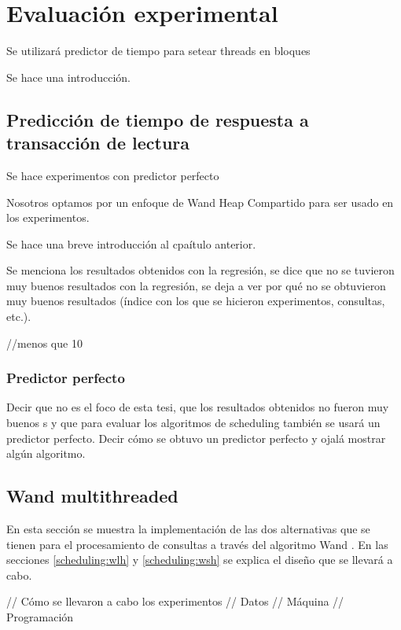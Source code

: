 \chapter{Evaluación experimental}
\label{cap:evaluacionexperimental}

Se utilizará predictor de tiempo para setear threads en bloques


Se hace una introducción.

\section{Predicción de tiempo de respuesta a transacción de lectura}
\label{evaluacionexperimental:ptrq}
Se hace experimentos con predictor perfecto

Nosotros optamos por un enfoque de Wand Heap Compartido para ser usado en los experimentos.

Se hace una breve introducción al cpaítulo anterior. 

Se menciona los resultados obtenidos con la regresión, se dice que no se tuvieron muy buenos resultados con la regresión, se deja a ver por qué no se obtuvieron muy buenos resultados (índice con los que se hicieron experimentos, consultas, etc.).

	//menos que 10%
\subsection{Predictor perfecto}
\label{evaluacionexperimental:predictorperfecto}

Decir que no es el foco de esta tesi, que los resultados obtenidos no fueron muy buenos s y que para evaluar los algoritmos de scheduling  también se usará un predictor perfecto. Decir cómo se obtuvo un predictor perfecto y ojalá mostrar algún algoritmo.


\section{Wand multithreaded}
\label{evaluacionexperimental:wm}
En esta sección se muestra la implementación de las dos alternativas que se tienen para el procesamiento de consultas a través del algoritmo Wand \citep{Broder:2003}. En las secciones \ref{scheduling:wlh} y \ref{scheduling:wsh} se explica el diseño que se llevará a cabo. 

// Cómo se llevaron a cabo los experimentos
// Datos
// Máquina
// Programación 



